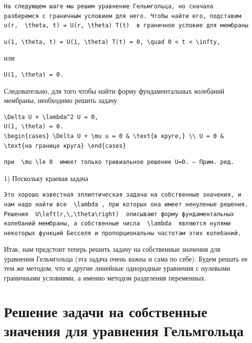 \documentclass[
  ukrainian,
]{article}
\begin{document}
\begin{verbatim}
На следующем шаге мы решим уравнение Гельмгольца, но сначала разберемся с граничным условием для него. Чтобы найти его, подставим  u(r,  \theta, t) = U(r, \theta) T(t)  в граничное условие для мембраны
\end{verbatim}

\begin{verbatim}
u(1, \theta, t) = U(1, \theta) T(t) = 0, \quad 0 < t < \infty,
\end{verbatim}

или

\begin{verbatim}
U(1, \theta) = 0.
\end{verbatim}

Следовательно, для того чтобы найти форму фундаментальных колебаний
мембраны, необходимо решить задачу

\begin{verbatim}
\Delta U + \lambda^2 U = 0,
U(1, \theta) = 0.
\begin{cases} \Delta U + \mu u = 0 & \text{в круге,} \\ U = 0 & \text{на границе круга} \end{cases}
\end{verbatim}

\begin{verbatim}
при  \mu \le 0  имеет только тривиальное решение U=0. — Прим. ред.
\end{verbatim}

1) Поскольку краевая задача

\begin{verbatim}
Это хорошо известная эллиптическая задача на собственные значения, и нам надо найти все  \lambda , при которых она имеет ненуленые решения. Решения  U\left(r,\,\theta\right)  описывают форму фундаментальных колебаний мембраны, а собственные числа  \lambda  являются нулями некоторых функций Бесселя и пропорциональны частотам этих колебаний.
\end{verbatim}

Итак, нам предстоит теперь решить задачу на собственные значения для
уравнения Гельмгольца (эта задача очень важна и сама по себе). Будем
решать ее тем же методом, что и другие линейные однородные уравнения с
нулевыми граничными условиями, а именно методом разделения переменных.

\section{Решение задачи на собственные значения для уравнения
Гельмгольца}\label{ux440ux435ux448ux435ux43dux438ux435-ux437ux430ux434ux430ux447ux438-ux43dux430-ux441ux43eux431ux441ux442ux432ux435ux43dux43dux44bux435-ux437ux43dux430ux447ux435ux43dux438ux44f-ux434ux43bux44f-ux443ux440ux430ux432ux43dux435ux43dux438ux44f-ux433ux435ux43bux44cux43cux433ux43eux43bux44cux446ux430}
\end{document}
